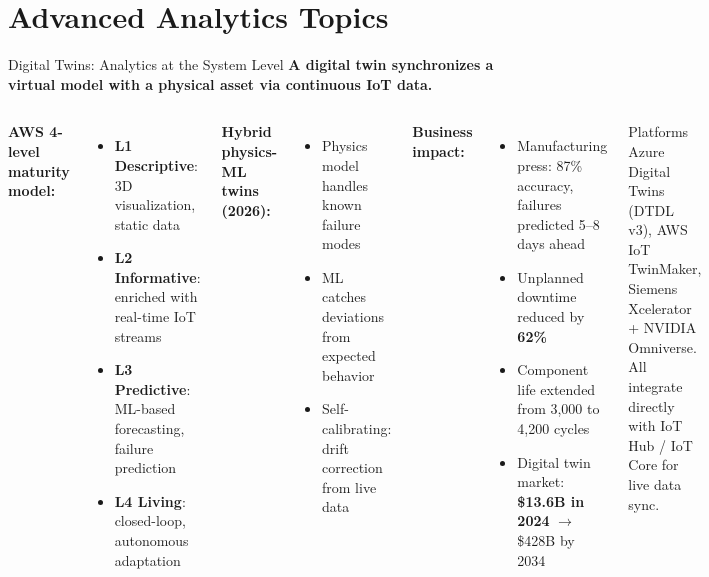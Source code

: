 \documentclass[aspectratio=169,11pt]{beamer}
\begin{document}
\section{Advanced Analytics Topics}

\begin{frame}{Digital Twins: Analytics at the System Level}
    \small
    \textbf{A digital twin synchronizes a virtual model with a physical asset via continuous IoT data.}

    \vspace{0.05cm}
    \begin{columns}
        \textbf{AWS 4-level maturity model:}
        \begin{itemize}\setlength{\itemsep}{0pt}
            \item \textbf{L1 Descriptive}: 3D visualization, static data
            \item \textbf{L2 Informative}: enriched with real-time IoT streams
            \item \textbf{L3 Predictive}: ML-based forecasting, failure prediction
            \item \textbf{L4 Living}: closed-loop, autonomous adaptation
        \end{itemize}

        \vspace{0.05cm}
        \textbf{Hybrid physics-ML twins (2026):}
        \begin{itemize}\setlength{\itemsep}{0pt}
            \item Physics model handles known failure modes
            \item ML catches deviations from expected behavior
            \item Self-calibrating: drift correction from live data
        \end{itemize}

        \textbf{Business impact:}
        \begin{itemize}\setlength{\itemsep}{0pt}
            \item Manufacturing press: 87\% accuracy, failures predicted 5--8 days ahead
            \item Unplanned downtime reduced by \textbf{62\%}
            \item Component life extended from 3,000 to 4,200 cycles
            \item Digital twin market: \textbf{\$13.6B in 2024} $\rightarrow$ \$428B by 2034
        \end{itemize}

        \vspace{0.05cm}
        \begin{exampleblock}{Platforms}
            Azure Digital Twins (DTDL v3), AWS IoT TwinMaker, Siemens Xcelerator + NVIDIA Omniverse. All integrate directly with IoT Hub / IoT Core for live data sync.
        \end{exampleblock}
    \end{columns}
\end{frame}
\end{document}
